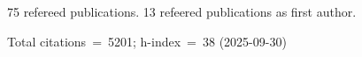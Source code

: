 75 refereed publications. 13 refeered publications as first author.

Total citations~=~5201; h-index~=~38 (2025-09-30)